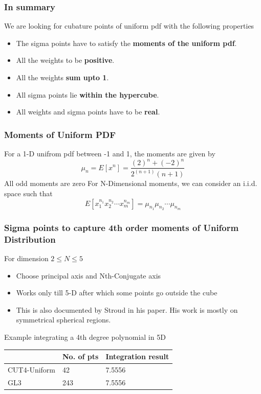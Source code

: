 \documentclass{beamer}
\begin{document}
\begin{frame}
\frametitle{In summary}
We are looking for cubature points of uniform pdf with the following properties
\begin{itemize}[<+->]
\item The sigma points have to satisfy the {\bf moments of the uniform pdf}.
\item All the weights to be {\bf positive}.
\item All the weights {\bf sum upto 1}.
\item All sigma points lie {\bf within the hypercube}.
\item All weights and sigma points have to be {\bf real}.
\end{itemize}
\end{frame}
\begin{frame}
\frametitle{Moments of Uniform PDF}
For a 1-D unifrom pdf between -1 and 1, the moments are given by 
\begin{equation}
\mu_n=E[x^n]=\frac{(2)^n+(-2)^n}{2^{(n+1)}(n+1)}
\end{equation}
All odd moments are zero\newline
For N-Dimensional moments, we can consider an i.i.d. space such that
\begin{equation}
E[x_1^{n_1}x_2^{n_2}\cdots x_m^{n_m}]=\mu_{n_1}\mu_{n_2}\cdots \mu_{n_m}
\end{equation}
\end{frame}
\begin{frame}
\frametitle{Sigma points to capture 4th order moments of Uniform Distribution}
For dimension $2\le N \le 5$
\begin{itemize}
\item Choose principal axis and Nth-Conjugate axis
\item Works only till 5-D after which some points go outside the cube
\item This is also documented by Stroud in his paper. His work is mostly on symmetrical spherical regions.
\end{itemize}
Example integrating a 4th degree polynomial in 5D
\begin{center}
  \begin{tabular}{ | l | l | l | }
    \hline
                  					&   No. of pts			& Integration result 	\\ 
    \hline 
      CUT4-Uniform          &   42       		  & 7.5556              \\
     \hline
      GL3          					&   243       		  & 7.5556              \\
      \hline
  \end{tabular}
\end{center}
\end{frame}
\end{document}
